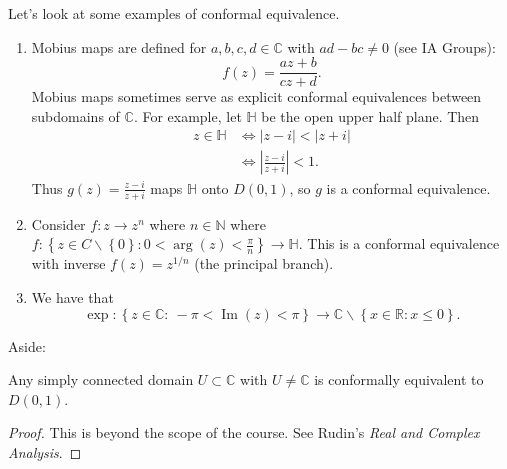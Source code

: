 \documentclass[a4paper]{scrartcl}
\begin{document}
\begin{example*}
     Let's look at some examples of conformal equivalence.
      \begin{enumerate}
           \item Mobius maps are defined for $a,b,c,d \in \mathbb{C}$ with $ad-bc \neq 0$ (see IA Groups): \[
           f (z)= \frac{az+b}{cz+d}
           .\] Mobius maps sometimes serve as explicit conformal equivalences between subdomains of $\mathbb{C}$. For example, let $\mathbb{H}$ be the open upper half plane. Then 
           \begin{align*}
                z \in \mathbb{H} &\iff |z-i| < |z+i|\\
                & \iff | \frac{z-i}{z+i}|<1.
           \end{align*}
           Thus $g (z)=\frac{z-i}{z+i}$ maps $\mathbb{H}$ onto $D (0,1)$, so $g$ is a conformal equivalence.
           \item Consider $f: z \rightarrow z^{n}$ where $n \in \mathbb{N}$ where $f: \left\{z \in C \backslash \left\{0\right\}: 0 < \operatorname{arg}(z) < \frac{\pi}{n}\right\} \rightarrow \mathbb{H}$. This is a conformal equivalence with inverse $f (z)=z^{1/n}$ (the principal branch).
           \item We have that \[
           \operatorname{exp}: \left\{z \in \mathbb{C}: \ -\pi < \operatorname{Im}(z)<\pi\right\} \rightarrow \mathbb{C} \backslash \left\{x \in \mathbb{R}: x \leq 0\right\}
           .\]  
      \end{enumerate}
\end{example*}
Aside:
\begin{theorem}
      Any simply connected domain $U \subset \mathbb{C}$ with $U \neq \mathbb{C}$ is conformally equivalent to $D (0,1)$.
\end{theorem}
\begin{proof}
      This is beyond the scope of the course. See Rudin's \emph{Real and Complex Analysis}.
\end{proof}
\end{document}
